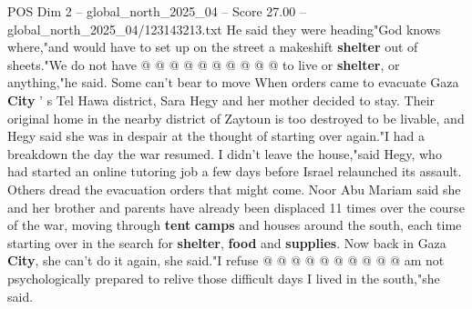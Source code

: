 \begin{textsample}{POS Dim 2 – global\_north\_2025\_04 – Score 27.00 – global\_north\_2025\_04/123143213.txt}
He said they were heading"God knows where,"and would have to set up on the street a makeshift \textbf{shelter} out of sheets."We do not have @ @ @ @ @ @ @ @ @ @ to live or \textbf{shelter}, or anything,"he said.
Some can't bear to move When orders came to evacuate Gaza \textbf{City} ' s Tel Hawa district, Sara Hegy and her mother decided to stay.
Their original home in the nearby district of Zaytoun is too destroyed to be livable, and Hegy said she was in despair at the thought of starting over again."I had a breakdown the day the war resumed.
I didn't leave the house,"said Hegy, who had started an online tutoring job a few days before Israel relaunched its assault.
Others dread the evacuation orders that might come.
Noor Abu Mariam said she and her brother and parents have already been displaced 11 times over the course of the war, moving through \textbf{tent} \textbf{camps} and houses around the south, each time starting over in the search for \textbf{shelter}, \textbf{food} and \textbf{supplies}.
Now back in Gaza \textbf{City}, she can't do it again, she said."I refuse @ @ @ @ @ @ @ @ @ @ am not psychologically prepared to relive those difficult days I lived in the south,"she said.

\end{textsample}
